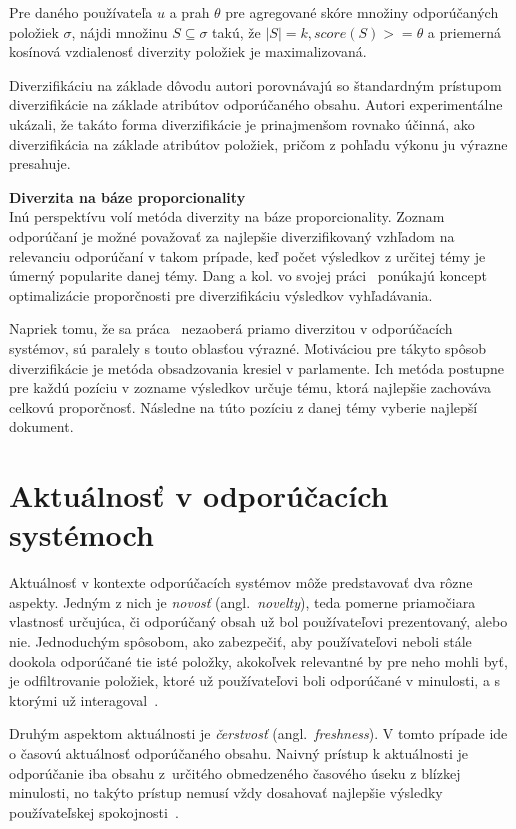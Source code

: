 \begin{adjustwidth}{1cm}{1cm}
Pre daného používateľa $u$ a prah $\theta$ pre agregované skóre množiny odporúčaných položiek $\sigma$, nájdi množinu
$S \subseteq \sigma$ takú, že $|S| = k, score(S) >= \theta$ a priemerná kosínová vzdialenosť diverzity položiek je maximalizovaná.
\end{adjustwidth}

Diverzifikáciu na základe dôvodu autori porovnávajú so štandardným prístupom diverzifikácie na základe atribútov odporúčaného obsahu.
Autori experimentálne ukázali, že takáto forma diverzifikácie je prinajmenšom rovnako účinná, ako diverzifikácia na
základe atribútov položiek, pričom z pohľadu výkonu ju výrazne presahuje.

\textbf{Diverzita na báze proporcionality}\\
Inú perspektívu volí metóda diverzity na báze proporcionality. Zoznam odporúčaní je možné považovať za najlepšie diverzifikovaný
vzhľadom na relevanciu odporúčaní v takom prípade, keď počet výsledkov z určitej témy je úmerný popularite danej témy.
Dang a kol. vo svojej práci~\cite{Dang2012} ponúkajú koncept optimalizácie proporčnosti pre diverzifikáciu výsledkov
vyhľadávania.

Napriek tomu, že sa práca~\cite{Dang2012} nezaoberá priamo diverzitou v odporúčacích systémov, sú paralely s touto
oblasťou výrazné. Motiváciou pre tákyto spôsob diverzifikácie je metóda obsadzovania kresiel v parlamente. Ich metóda
postupne pre každú pozíciu v zozname výsledkov určuje tému, ktorá najlepšie zachováva celkovú proporčnosť. Následne
na túto pozíciu z danej témy vyberie najlepší dokument.


\section{Aktuálnosť v odporúčacích systémoch}

Aktuálnosť v kontexte odporúčacích systémov môže predstavovať dva rôzne aspekty. Jedným z nich je \emph{novosť}
(angl.~\emph{novelty}), teda pomerne priamočiara vlastnosť určujúca, či odporúčaný obsah už bol používateľovi prezentovaný,
alebo nie. Jednoduchým spôsobom, ako zabezpečiť, aby používateľovi neboli stále dookola odporúčané tie isté položky,
akokoľvek relevantné by pre neho mohli byť, je odfiltrovanie položiek, ktoré už používateľovi boli odporúčané v minulosti,
a s ktorými už interagoval~\cite{Handbook2011}.

Druhým aspektom aktuálnosti je \emph{čerstvosť} (angl.~\emph{freshness}). V tomto prípade ide o časovú aktuálnosť odporúčaného
obsahu. Naivný prístup k aktuálnosti je odporúčanie iba obsahu z~určitého obmedzeného časového úseku z blízkej minulosti,
no takýto prístup nemusí vždy dosahovať najlepšie výsledky používateľskej spokojnosti~\cite{Szpektor2013}.

